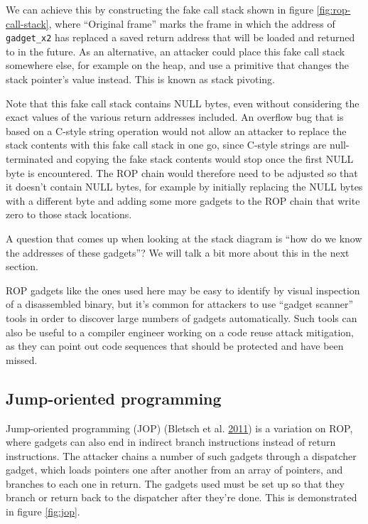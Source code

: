 \documentclass[a4paper,]{report}
\begin{document}
We can achieve this by constructing the fake call stack shown in figure
\ref{fig:rop-call-stack}, where ``Original frame'' marks the frame in
which the address of \texttt{gadget\_x2} has replaced a saved return
address that will be loaded and returned to in the future. As an
alternative, an attacker could place this fake call stack somewhere
else, for example on the heap, and use a primitive that changes the
stack pointer's value instead. This is known as stack
pivoting.

Note that this fake call stack contains NULL bytes, even without
considering the exact values of the various return addresses included.
An overflow bug that is based on a C-style string operation would not
allow an attacker to replace the stack contents with this fake call
stack in one go, since C-style strings are null-terminated and copying
the fake stack contents would stop once the first NULL byte is
encountered. The ROP chain would therefore need to be adjusted so that
it doesn't contain NULL bytes, for example by initially replacing the
NULL bytes with a different byte and adding some more gadgets to the ROP
chain that write zero to those stack locations.

A question that comes up when looking at the stack diagram is ``how do
we know the addresses of these gadgets''? We will talk a bit more about
this in the next section.

ROP gadgets like the ones used here may be easy to identify by visual
inspection of a disassembled binary, but it's common for attackers to
use ``gadget scanner'' tools in order to discover
large numbers of gadgets automatically. Such tools can also be useful to
a compiler engineer working on a code reuse attack mitigation, as they
can point out code sequences that should be protected and have been
missed.

\hypertarget{jump-oriented-programming}{%
\subsection{Jump-oriented programming}\label{jump-oriented-programming}}

Jump-oriented programming (JOP)
(Bletsch et al. \protect\hyperlink{ref-Bletsch2011}{2011}) is a
variation on ROP, where gadgets can also end in indirect branch
instructions instead of return instructions. The attacker chains a
number of such gadgets through a dispatcher
gadget, which loads pointers one after another
from an array of pointers, and branches to each one in return. The
gadgets used must be set up so that they branch or return back to the
dispatcher after they're done. This is demonstrated in figure
\ref{fig:jop}.
\end{document}
